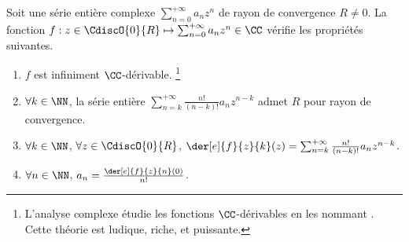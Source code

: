 

\newpage

\begin{preli} \label{der-power-serie}
    Soit une série entière complexe $\sum_{n=0}^{+\infty} a_n z^n$ de rayon de convergence $R \neq 0$.
    La fonction $f: z \in \CdiscO{0}{R} \mapsto \sum_{n=0}^{+\infty} a_n z^n \in \CC$ vérifie les propriétés suivantes.
    \begin{enumerate}
    	\item $f$ est infiniment $\CC$-dérivable.%
		\footnote{
			L'analyse complexe étudie les fonctions $\CC$-dérivables en les nommant .
			Cette théorie est ludique, riche, et puissante.
		}

    	\item $\forall k \in \NN$,
		la série entière $\sum_{n = k}^{+\infty} \frac{n!}{(n-k)!} a_n z^{n - k}$ admet $R$ pour rayon de convergence.

    	\item $\forall k \in \NN$, $\forall z \in \CdiscO{0}{R}$,
		$\der[e]{f}{z}{k}(z) = \sum_{n = k}^{+\infty} \frac{n!}{(n-k)!} a_n z^{n - k}$.

    	\item \label{a_n-value}
		$\forall n \in \NN$,  $a_n = \frac{\der[e]{f}{z}{n}(0)}{n!}$.
    \end{enumerate}
\end{preli}


